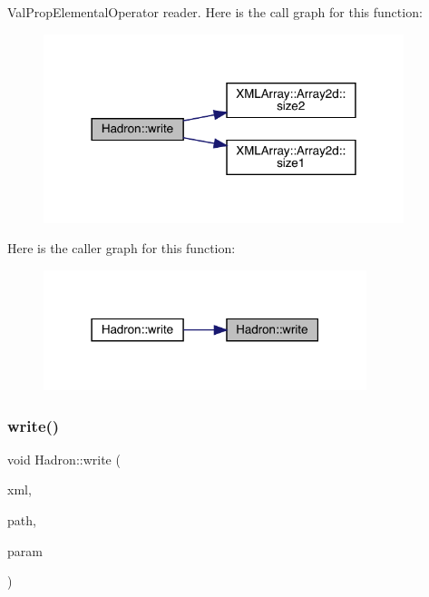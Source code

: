 Val\+Prop\+Elemental\+Operator reader. Here is the call graph for this function\+:
\nopagebreak
\begin{figure}[H]
\begin{center}
\leavevmode
\includegraphics[width=298pt]{d1/daf/namespaceHadron_a4e777dd6c1ccf60b80a383fd5901627b_cgraph}
\end{center}
\end{figure}
Here is the caller graph for this function\+:
\nopagebreak
\begin{figure}[H]
\begin{center}
\leavevmode
\includegraphics[width=267pt]{d1/daf/namespaceHadron_a4e777dd6c1ccf60b80a383fd5901627b_icgraph}
\end{center}
\end{figure}
\mbox{\label{namespaceHadron_a25da56def6a3cbbe579c9b7b4d27e848}} 
\subsubsection{\texorpdfstring{write()}{write()}\hspace{0.1cm}{\footnotesize\ttfamily [68/95]}}
{\footnotesize\ttfamily void Hadron\+::write (\begin{DoxyParamCaption}\item[{\mbox{\hyperlink{classADATXML_1_1XMLWriter}{X\+M\+L\+Writer}} \&}]{xml,  }\item[{const std\+::string \&}]{path,  }\item[{const \mbox{\hyperlink{structHadron_1_1KeyHadronNPartNPtConnGraph__t}{Key\+Hadron\+N\+Part\+N\+Pt\+Conn\+Graph\+\_\+t}} \&}]{param }\end{DoxyParamCaption})}



